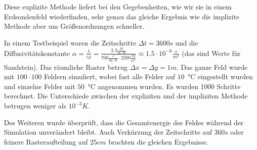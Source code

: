 \documentclass[12pt,a4paper]{article}
\begin{document}
Diese explizite Methode liefert bei den Gegebenheiten, wie wir sie in einem Erdsondenfeld wiederfinden, sehr genau das gleiche Ergebnis wie die implizite Methode aber um Größenordnungen schneller. \\
\begin{sloppypar}
In einem Testbeispiel waren die Zeitschritte $\Delta t = 3600s$ und die Diffusivitätskonstante \mbox{$\alpha = \frac{\lambda}{c\rho} = \frac{2.3\frac{W}{m \cdot K}}{700\frac{J}{kg \cdot K} \cdot 2200\frac{kg}{m^3}} \approx 1.5\cdot 10^{-6}\frac{s}{m^2}$} (das sind Werte für Sandstein). Das räumliche Raster betrug \mbox{$\Delta x = \Delta y = 1m$}. Das ganze Feld wurde mit $100 \cdot 100$ Feldern simuliert, wobei fast alle Felder auf $10$~°C eingestellt wurden und einzelne Felder mit $50$~°C angenommen wurden. Es wurden 1000 Schritte berechnet. Die Unterschiede zwischen der expliziten und der impliziten Methode betrugen weniger als $10^{-3}K$.
\end{sloppypar}
Des Weiteren wurde überprüft, dass die Gesamtenergie des Feldes während der Simulation unverändert bleibt. Auch Verkürzung der Zeitschritte auf $360s$ oder feinere Rasteraufteilung auf $25cm$ brachten die gleichen Ergebnisse.
\end{document}
